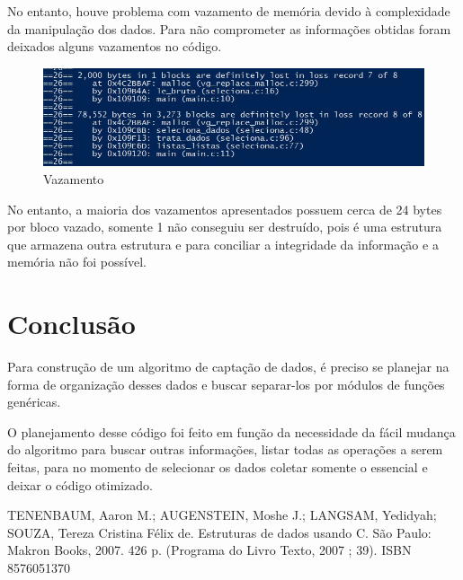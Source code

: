 \documentclass[conference]{IEEEtran}
\begin{document}
No entanto, houve problema com vazamento de memória devido à complexidade da manipulação dos dados. Para não comprometer as informações obtidas foram deixados alguns vazamentos no código.

\begin{figure}[htb]
	\caption{\label{Leak}Vazamento}
	\begin{center}
	    \includegraphics[scale=0.4]{figs/vazamento.jpg}
	\end{center}
\end{figure}

No entanto, a maioria dos vazamentos apresentados possuem cerca de 24 bytes por bloco vazado, somente 1 não conseguiu ser destruído, pois é uma estrutura que armazena outra estrutura e para conciliar a integridade da informação e a memória não foi possível.

\section{Conclusão}
Para construção de um algoritmo de captação de dados, é preciso se planejar na forma de organização desses dados e buscar separar-los por módulos de funções genéricas.

O planejamento desse código foi feito em função da necessidade da fácil mudança do algoritmo para buscar outras informações, listar todas as operações a serem feitas, para no momento de selecionar os dados coletar somente o essencial e deixar o código otimizado.

\begin{thebibliography}{00}

 TENENBAUM, Aaron M.; AUGENSTEIN, Moshe J.; LANGSAM, Yedidyah; SOUZA, Tereza Cristina Félix de. Estruturas de dados usando C. São Paulo: Makron Books, 2007. 426 p. (Programa do Livro Texto, 2007 ; 39). ISBN 8576051370


\end{thebibliography}
\end{document}
